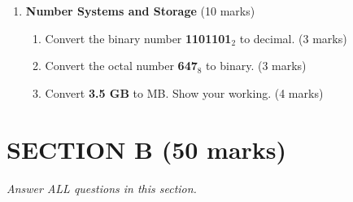 \documentclass[12pt]{article}
\begin{document}
\begin{enumerate}[left=0pt, label=\bfseries Q\arabic*.]
    \item \textbf{Number Systems and Storage} \hfill (10 marks)
    \begin{enumerate}[label=(\alph*)]
        \item Convert the binary number \textbf{1101101$_2$} to decimal. \hfill (3 marks)
        \item Convert the octal number \textbf{647$_8$} to binary. \hfill (3 marks)
        \item Convert \textbf{3.5 GB} to MB. Show your working. \hfill (4 marks)
    \end{enumerate}
\end{enumerate}

\newpage

\section*{SECTION B (50 marks)}
\textit{Answer ALL questions in this section.}
\end{document}
